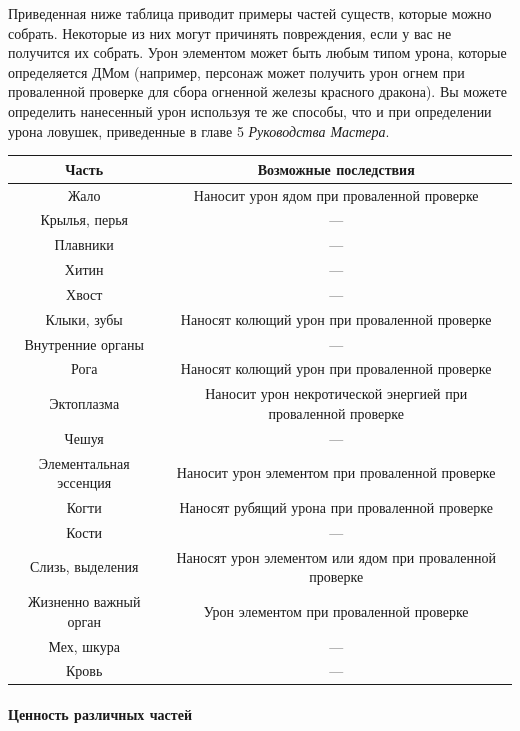 \documentclass[a4paper, 9pt, twocolumn]{book}
\begin{document}
	Приведенная ниже таблица приводит примеры частей существ, которые можно собрать. Некоторые из них могут причинять повреждения, если у вас не получится их собрать. Урон элементом может быть любым типом урона, которые определяется ДМом (например, персонаж может получить урон огнем при проваленной проверке для сбора огненной железы красного дракона). Вы можете определить нанесенный урон используя те же способы, что и при определении урона ловушек, приведенные в главе 5 \textit{Руководства Мастера}.	
	
\begin{center}
	
	\begin{tabular}{|c|c|}
		\hline
		\textbf{Часть} & \textbf{Возможные последствия} \\
		\hline
		Жало & Наносит урон ядом при проваленной проверке \\
		\hline
		Крылья, перья & --- \\
		\hline
		Плавники & --- \\
		\hline
		Хитин & --- \\
		\hline
		Хвост & --- \\
		\hline
		Клыки, зубы & Наносят колющий урон при проваленной проверке \\
		\hline
		Внутренние органы & ---  \\
		\hline
		Рога & Наносят колющий урон при проваленной проверке \\
		\hline
		Эктоплазма & Наносит урон некротической энергией при проваленной проверке \\
		\hline
		Чешуя & --- \\
		\hline
		Элементальная эссенция & Наносит урон элементом при проваленной проверке \\
		\hline
		Когти & Наносят рубящий урона при проваленной проверке \\
		\hline
		Кости & --- \\
		\hline
		Слизь, выделения & Наносят урон элементом или ядом при проваленной проверке \\
		\hline
		Жизненно важный орган & Урон элементом при проваленной проверке  \\
		\hline
		Мех, шкура & --- \\
		\hline
		Кровь & --- \\
		\hline
	\end{tabular}

\end{center}
	
	\paragraph*{Ценность различных частей}
	
\end{document}
